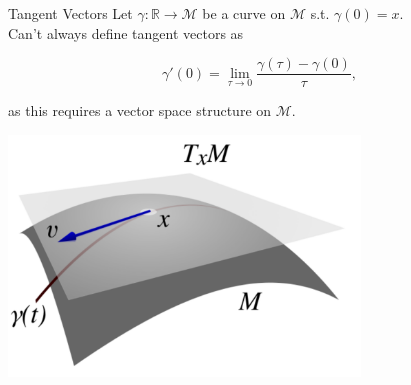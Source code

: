 \documentclass[xcolor=dvipsnames,t]{beamer} %
\newcommand{\reals}{\mathbb{R}}
\begin{document}
\begin{frame}{Tangent Vectors}
   Let $\gamma:\reals\to\mathcal{M}$ be a curve on $\mathcal{M}$ s.t. $\gamma(0)=x$.\\[.5em]
   Can't always define tangent vectors as 

   \[ \gamma'(0) = \lim_{\tau\to 0} \dfrac{\gamma(\tau)-\gamma(0)}{\tau}, \] 
   
   \noindent as this requires a vector space structure on $\mathcal{M}$.
    
   \begin{center}
      \includegraphics[width=0.7\textwidth]{figures/tangent_space.pdf}
   \end{center}
\end{frame}
\end{document}
